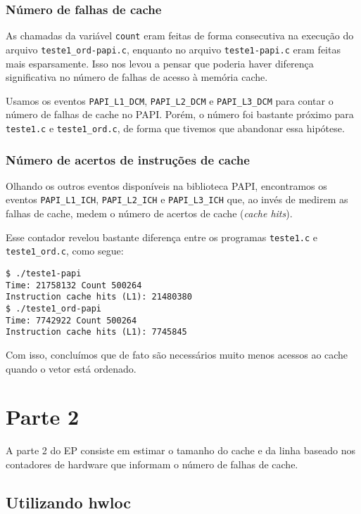 \documentclass[a4paper,oneside,12pt]{article}
\begin{document}
\subsubsection{Número de falhas de cache}

As chamadas da variável {\tt count} eram feitas de forma consecutiva na execução do arquivo {\tt teste1\_ord-papi.c}, enquanto no arquivo {\tt teste1-papi.c} eram feitas mais esparsamente. Isso nos levou a pensar que poderia haver diferença significativa no número de falhas de acesso à memória cache.

Usamos os eventos {\tt PAPI\_L1\_DCM}, {\tt PAPI\_L2\_DCM} e {\tt PAPI\_L3\_DCM} para contar o número de falhas de cache no PAPI. Porém, o número foi bastante próximo para {\tt teste1.c} e {\tt teste1\_ord.c}, de forma que tivemos que abandonar essa hipótese.

\subsubsection{Número de acertos de instruções de cache}

Olhando os outros eventos disponíveis na biblioteca PAPI, encontramos os eventos {\tt PAPI\_L1\_ICH}, {\tt PAPI\_L2\_ICH} e {\tt PAPI\_L3\_ICH} que, ao invés de medirem as falhas de cache, medem o número de acertos de cache (\emph{cache hits}).

Esse contador revelou bastante diferença entre os programas {\tt teste1.c} e {\tt teste1\_ord.c}, como segue:

\begin{verbatim}
$ ./teste1-papi
Time: 21758132 Count 500264
Instruction cache hits (L1): 21480380
$ ./teste1_ord-papi
Time: 7742922 Count 500264
Instruction cache hits (L1): 7745845
\end{verbatim}

Com isso, concluímos que de fato são necessários muito menos acessos ao cache quando o vetor está ordenado.

\section{Parte 2}

A parte 2 do EP consiste em estimar o tamanho do cache e da linha baseado nos contadores de hardware que informam o número de falhas de cache.

\subsection{Utilizando hwloc}
\end{document}
